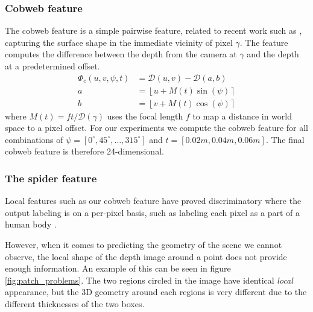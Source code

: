 \documentclass[10pt,twocolumn,letterpaper]{article}
\newcommand{\degree}{^{\circ}}
\newcommand{\rgbdimage}{\mathcal{D}}
\newcommand{\pixelidx}{\gamma}
\newcommand{\note}[1]{\textcolor{blue}{NOTE: #1}}
\begin{document}
\subsubsection{Cobweb feature }
The cobweb feature is a simple pairwise feature, related to recent work such as \cite{shotton-cvpr-2011, tola-pami-2010}, capturing the surface shape in the immediate vicinity of pixel $\pixelidx$.
The feature computes the difference between the depth from the camera at $\pixelidx$ and the depth at a predetermined offset.
\begin{align}
\Phi_c(u, v, \psi, t) &= \rgbdimage(u, v) - \rgbdimage(a, b) \\
a &= \left\lfloor u + M(t)  \sin(\psi) \right\rceil \\
b &= \left\lfloor v + M(t)  \cos(\psi) \right\rceil
\end{align}
where $M(t) = ft / \rgbdimage(\pixelidx)$ uses the focal length $f$ to map a distance in world space to a pixel offset. For our experiments we compute the cobweb feature for all combinations of $\psi = [0\degree, 45\degree, \ldots, 315\degree]$ and $t = [0.02m, 0.04m, 0.06m]$.
The final cobweb feature is therefore 24-dimensional.

\subsubsection{The spider feature}

Local features such as our cobweb feature have proved discriminatory where the output labeling is on a per-pixel basis, such as labeling each pixel as a part of a human body \cite{shotton-cvpr-2011}.

However, when it comes to predicting the geometry of the scene we cannot observe, the local shape of the depth image around a point does not provide enough information. 
An example of this can be seen in figure \ref{fig:patch_problems}.
The two regions circled in the image have identical \emph{local} appearance, but the 3D geometry around each regions is very different due to the different thicknesses of the two boxes.
\end{document}
